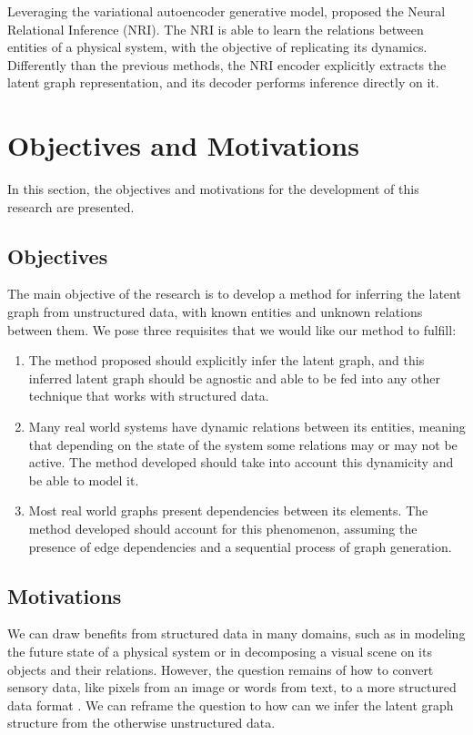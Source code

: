 \documentclass[12pt,a4paper]{article}
\begin{document}
	Leveraging the variational autoencoder generative model, \textcite{KipfNRI2018} proposed the Neural Relational Inference (NRI). The NRI is able to learn the relations between entities of a physical system, with the objective of replicating its dynamics. Differently than the previous methods, the NRI encoder explicitly extracts the latent graph representation, and its decoder performs inference directly on it.

	\section{Objectives and Motivations}
	\label{sec:Objectives_and_motivations}

	In this section, the objectives and motivations for the development of this research are presented.

	\subsection{Objectives}

	The main objective of the research is to develop a method for inferring the latent graph from unstructured data, with known entities and unknown relations between them. We pose three requisites that we would like our method to fulfill:

	\begin{enumerate}
		\item The method proposed should explicitly infer the latent graph, and this inferred latent graph should be agnostic and able to be fed into any other technique that works with structured data.
		\item Many real world systems have dynamic relations between its entities, meaning that depending on the state of the system some relations may or may not be active. The method developed should take into account this dynamicity and be able to model it.
		\item Most real world graphs present dependencies between its elements. The method developed should account for this phenomenon, assuming the presence of edge dependencies and a sequential process of graph generation.
	\end{enumerate}

	\subsection{Motivations}

	We can draw benefits from structured data in many domains, such as in modeling the future state of a physical system or in decomposing a visual scene on its objects and their relations. However, the question remains of how to convert sensory data, like pixels from an image or words from text, to a more structured data format \citep{Battaglia2018}.  We can reframe the question to how can we infer the latent graph structure from the otherwise unstructured data.
\end{document}
